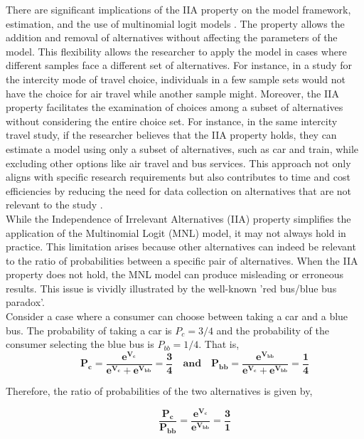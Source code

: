 \documentclass[a4paper,11pt]{article}
\begin{document}
    There are significant implications of the IIA property on the model framework, estimation, and the use of multinomial logit models \cite{Koppelman&Bhat}. The property allows the addition and removal of alternatives without affecting the parameters of the model. This flexibility allows the researcher to apply the model in cases where different samples face a different set of alternatives. For instance, in a study for the intercity mode of travel choice, individuals in a few sample sets would not have the choice for air travel while another sample might. Moreover, the IIA property facilitates the examination of choices among a subset of alternatives without considering the entire choice set. For instance, in the same intercity travel study, if the researcher believes that the IIA property holds, they can estimate a model using only a subset of alternatives, such as car and train, while excluding other options like air travel and bus services. This approach not only aligns with specific research requirements but also contributes to time and cost efficiencies by reducing the need for data collection on alternatives that are not relevant to the study \cite{Train}.\\

    While the Independence of Irrelevant Alternatives (IIA) property simplifies the application of the Multinomial Logit (MNL) model, it may not always hold in practice. This limitation arises because other alternatives can indeed be relevant to the ratio of probabilities between a specific pair of alternatives. When the IIA property does not hold, the MNL model can produce misleading or erroneous results. This issue is vividly illustrated by the well-known 'red bus/blue bus paradox'.\\

    \newpage
    Consider a case where a consumer can choose between taking a car and a blue bus. The probability of taking a car is $P_{c} = 3/4$ and the probability of the consumer selecting the blue bus is $P_{bb} = 1/4$. That is,
    \begin{equation*}
        \qquad \mathbf{P_{c} = \dfrac{e^{V_{c}}}{e^{V_{c}} + e^{V_{bb}}} = \dfrac{3}{4} \quad \text{and} \quad P_{bb} = \dfrac{e^{V_{bb}}}{e^{V_{c}} + e^{V_{bb}}} = \dfrac{1}{4} }
    \end{equation*}
    
    Therefore, the ratio of probabilities of the two alternatives is given by,

    \begin{equation*}
        \qquad \mathbf{\dfrac{P_{c}}{P_{bb}}  = \dfrac{e^{V_{c}}}{e^{V_{bb}}} = \dfrac{3}{1}}
    \end{equation*}
    
\end{document}
